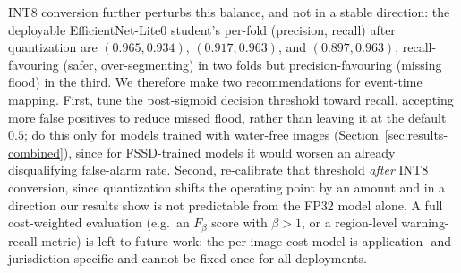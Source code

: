 INT8 conversion further perturbs this balance, and not in a stable direction: the deployable EfficientNet-Lite0 student's per-fold (precision, recall) after quantization are $(0.965, 0.934)$, $(0.917, 0.963)$, and $(0.897, 0.963)$, recall-favouring (safer, over-segmenting) in two folds but precision-favouring (missing flood) in the third. We therefore make two recommendations for event-time mapping. First, tune the post-sigmoid decision threshold toward recall, accepting more false positives to reduce missed flood, rather than leaving it at the default $0.5$; do this only for models trained with water-free images (Section~\ref{sec:results-combined}), since for FSSD-trained models it would worsen an already disqualifying false-alarm rate. Second, re-calibrate that threshold \emph{after} INT8 conversion, since quantization shifts the operating point by an amount and in a direction our results show is not predictable from the FP32 model alone. A full cost-weighted evaluation (e.g.\ an $F_\beta$ score with $\beta>1$, or a region-level warning-recall metric) is left to future work: the per-image cost model is application- and jurisdiction-specific and cannot be fixed once for all deployments.
